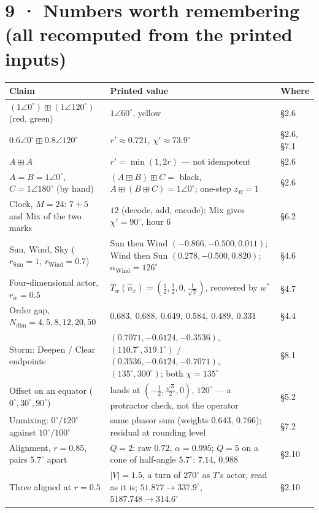 \documentclass[10.5pt]{article}
\begin{document}
\section*{9 · Numbers worth remembering (all recomputed from the printed inputs)}
{\small\setlength{\tabcolsep}{4pt}\begin{longtable}{L{5.2cm}L{9.5cm}L{1.6cm}}
\toprule
\textbf{Claim} & \textbf{Printed value} & \textbf{Where} \\
\midrule
\endhead
$(1\angle0^\circ)\boxplus(1\angle120^\circ)$ (red, green) & $1\angle60^\circ$, yellow & §2.6 \\
$0.6\angle0^\circ\boxplus0.8\angle120^\circ$ & $r'\approx0.721$, $\chi'\approx73.9^\circ$ & §2.6, §7.1 \\
$A\boxplus A$ & $r'=\min(1,2r)$ — not idempotent & §2.6 \\
$A=B=1\angle0^\circ$, $C=1\angle180^\circ$ (by hand) & $(A\boxplus B)\boxplus C=$ black, $A\boxplus(B\boxplus C)=1\angle0^\circ$; one-step $z_B=1$ & §2.6 \\
Clock, $M=24$: $7+5$ and Mix of the two marks & $12$ (decode, add, encode); Mix gives $\chi'=90^\circ$, hour $6$ & §6.2 \\
Sun, Wind, Sky ($r_{\text{Sun}}=1$, $r_{\text{Wind}}=0.7$) & Sun then Wind $(-0.866,-0.500,0.011)$; Wind then Sun $(0.278,-0.500,0.820)$; $\alpha_{\text{Wind}}=126^\circ$ & §4.6 \\
Four-dimensional actor, $r_w=0.5$ & $T_w(\hat n_x)=(\tfrac12,\tfrac12,0,\tfrac1{\sqrt2})$, recovered by $w^*$ & §4.7 \\
Order gap, $N_{\mathrm{dim}}=4,5,8,12,20,50$ & $0.683,\ 0.688,\ 0.649,\ 0.584,\ 0.489,\ 0.331$ & §4.4 \\
Storm: Deepen / Clear endpoints & $(0.7071,-0.6124,-0.3536)$, $(110.7^\circ,319.1^\circ)$ / $(0.3536,-0.6124,-0.7071)$, $(135^\circ,300^\circ)$; both $\chi=135^\circ$ & §8.1 \\
Offset on an equator ($0^\circ,30^\circ,90^\circ$) & lands at $(-\tfrac12,\tfrac{\sqrt3}2,0)$, $120^\circ$ — a protractor check, not the operator & §5.2 \\
Unmixing: $0^\circ/120^\circ$ against $10^\circ/100^\circ$ & same phasor sum (weights $0.643$, $0.766$); residual at rounding level & §7.2 \\
Alignment, $r=0.85$, pairs $5.7^\circ$ apart & $Q=2$: raw $0.72$, $\alpha=0.995$; $Q=5$ on a cone of half-angle $5.7^\circ$: $7.14$, $0.988$ & §2.10 \\
Three aligned at $r=0.5$ & $\lvert V\rvert=1.5$, a turn of $270^\circ$ as $T$'s actor, read as it is; $51.877\to337.9^\circ$, $5187.748\to314.6^\circ$ & §2.10 \\

\end{longtable}}
\end{document}
